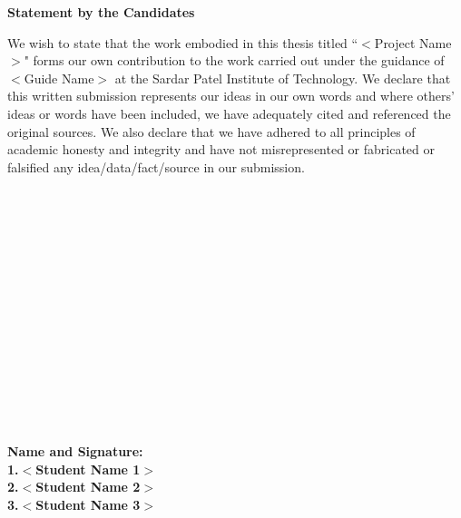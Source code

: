 \newpage
\thispagestyle{empty}
\vspace*{0.2cm}
\vspace{1cm}
\begin{center}
 \large\textbf{Statement by the Candidates}
\end{center}
\vspace{2cm}
We wish to state that the work embodied in this thesis titled ``$<$Project Name$>$" forms our own contribution to the work carried out under the guidance of $<$Guide Name$>$ at the Sardar Patel Institute of Technology. We declare that this written submission represents our ideas in our own words and where others' ideas or words have been included, we have adequately cited and referenced the original sources. We also declare that we have adhered to all principles of academic honesty and integrity and have not misrepresented or fabricated or falsified any idea/data/fact/source in our submission.
\\
\\
\\
\\
\\
\\
\\
\\
\\ 
\\
\\
\\
\\
\\
\\
\\
\textbf {Name and Signature:}\\
\textbf {1.$<$Student Name 1$>$}\\
\textbf {2.$<$Student Name 2$>$}\\
\textbf {3.$<$Student Name 3$>$}\\
\newpage

